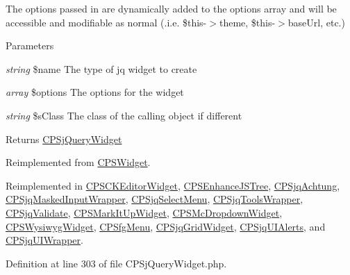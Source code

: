 The options passed in are dynamically added to the options array and will be accessible and modifiable as normal (.i.e. \$this-\/$>$theme, \$this-\/$>$baseUrl, etc.)


\begin{DoxyParams}{Parameters}
\item[{\em string}]\$name The type of jq widget to create \item[{\em array}]\$options The options for the widget \item[{\em string}]\$sClass The class of the calling object if different \end{DoxyParams}
\begin{DoxyReturn}{Returns}
\hyperlink{classCPSjQueryWidget}{CPSjQueryWidget} 
\end{DoxyReturn}


Reimplemented from \hyperlink{classCPSWidget_af09cbabc6ce2c1d9d9efb7ae308ea0f3}{CPSWidget}.



Reimplemented in \hyperlink{classCPSCKEditorWidget_a0ffc269a208148ade57c7eb608a4562a}{CPSCKEditorWidget}, \hyperlink{classCPSEnhanceJSTree_a0ffc269a208148ade57c7eb608a4562a}{CPSEnhanceJSTree}, \hyperlink{classCPSjqAchtung_a0ffc269a208148ade57c7eb608a4562a}{CPSjqAchtung}, \hyperlink{classCPSjqMaskedInputWrapper_a0ffc269a208148ade57c7eb608a4562a}{CPSjqMaskedInputWrapper}, \hyperlink{classCPSjqSelectMenu_a0ffc269a208148ade57c7eb608a4562a}{CPSjqSelectMenu}, \hyperlink{classCPSjqToolsWrapper_a0ffc269a208148ade57c7eb608a4562a}{CPSjqToolsWrapper}, \hyperlink{classCPSjqValidate_a0ffc269a208148ade57c7eb608a4562a}{CPSjqValidate}, \hyperlink{classCPSMarkItUpWidget_a0ffc269a208148ade57c7eb608a4562a}{CPSMarkItUpWidget}, \hyperlink{classCPSMcDropdownWidget_a0ffc269a208148ade57c7eb608a4562a}{CPSMcDropdownWidget}, \hyperlink{classCPSWysiwygWidget_a0ffc269a208148ade57c7eb608a4562a}{CPSWysiwygWidget}, \hyperlink{classCPSfgMenu_a0ffc269a208148ade57c7eb608a4562a}{CPSfgMenu}, \hyperlink{classCPSjqGridWidget_a0ffc269a208148ade57c7eb608a4562a}{CPSjqGridWidget}, \hyperlink{classCPSjqUIAlerts_a0ffc269a208148ade57c7eb608a4562a}{CPSjqUIAlerts}, and \hyperlink{classCPSjqUIWrapper_a0ffc269a208148ade57c7eb608a4562a}{CPSjqUIWrapper}.



Definition at line 303 of file CPSjQueryWidget.php.






